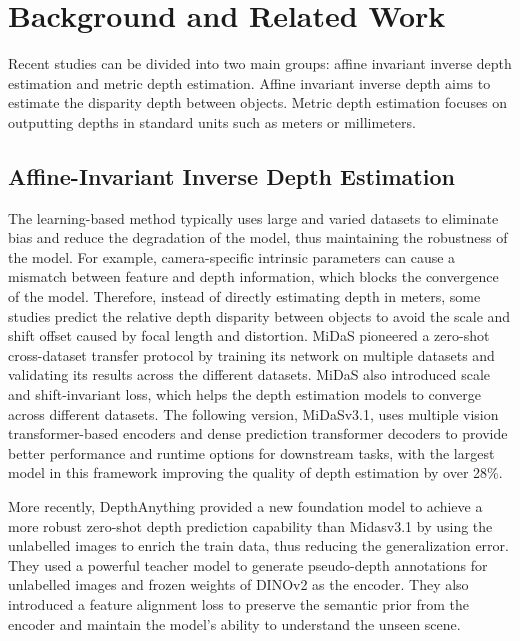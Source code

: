 \documentclass{article}
\begin{document}
\section{Background and Related Work}
Recent studies can be divided into two main groups: affine invariant inverse depth estimation and metric depth estimation. Affine invariant inverse depth aims to estimate the disparity depth between objects. Metric depth estimation focuses on outputting depths in standard units such as meters or millimeters.
\subsection{Affine-Invariant Inverse Depth Estimation}
The learning-based method typically uses large and varied datasets to eliminate bias and reduce the degradation of the model, thus maintaining the robustness of the model. For example, camera-specific intrinsic parameters can cause a mismatch between feature and depth information, which blocks the convergence of the model. Therefore, instead of directly estimating depth in meters, some studies predict the relative depth disparity between objects to avoid the scale and shift offset caused by focal length and distortion. MiDaS\cite{MiDaS} pioneered a zero-shot cross-dataset transfer protocol by training its network on multiple datasets and validating its results across the different datasets. MiDaS also introduced scale and shift-invariant loss, which helps the depth estimation models to converge across different datasets. The following version, MiDaSv3.1\cite{MiDaSv3.1}, uses multiple vision transformer-based encoders \cite{beit,dosovitskiy2020vit,liu2021Swin,liu2021swinv2} and dense prediction transformer decoders \cite{dpt} to provide better performance and runtime options for downstream tasks, with the largest model in this framework improving the quality of depth estimation by over 28\%.

More recently, DepthAnything\cite{depth_anything_v1} provided a new foundation model to achieve a more robust zero-shot depth prediction capability than Midasv3.1 by using the unlabelled images to enrich the train data, thus reducing the generalization error. They used a powerful teacher model to generate pseudo-depth annotations for unlabelled images and frozen weights of DINOv2\cite{oquab2023dinov2} as the encoder. They also introduced a feature alignment loss to preserve the semantic prior from the encoder and maintain the model's ability to understand the unseen scene.
\end{document}
